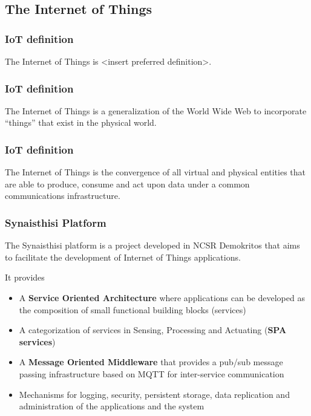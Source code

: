 \subsection{The Internet of Things}


\begin{frame}
\frametitle{IoT definition}
The Internet of Things is <insert preferred definition>.
\end{frame}


\begin{frame}
\frametitle{IoT definition}
The Internet of Things is a generalization of the World Wide Web to incorporate ``things'' that exist in the physical world. 
\end{frame}

\begin{frame}
\frametitle{IoT definition}
The Internet of Things is the convergence of all virtual and physical entities that are able to produce, consume and act upon data under a common communications infrastructure.
\end{frame}

\begin{frame}
\frametitle{Synaisthisi Platform}
The Synaisthisi platform is a project developed in NCSR Demokritos that aims to facilitate the development of Internet of Things applications.

It provides
\begin{itemize}
\item A \textbf{Service Oriented Architecture} where applications can be developed as the composition of small functional building blocks (services) 
\item A categorization of services in Sensing, Processing and Actuating (\textbf{SPA services})
\item A \textbf{Message Oriented Middleware} that provides a pub/sub message passing infrastructure based on MQTT for inter-service communication
\item Mechanisms for logging, security, persistent storage, data replication and administration of the applications and the system
\end{itemize}
\end{frame}


